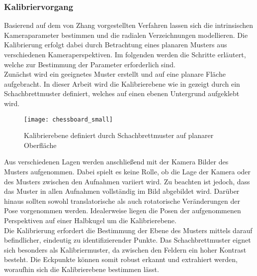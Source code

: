 \subsubsection{Kalibriervorgang}
Basierend auf dem von Zhang \cite{Zhang2000} vorgestellten Verfahren lassen sich die intrinsischen Kameraparameter bestimmen und die radialen Verzeichnungen modellieren. Die Kalibrierung erfolgt dabei durch Betrachtung eines planaren Musters aus verschiedenen Kameraperspektiven. Im folgenden werden die Schritte erläutert, welche zur Bestimmung der Parameter erforderlich sind.\\

Zunächst wird ein geeignetes Muster erstellt und auf eine planare Fläche aufgebracht. In dieser Arbeit wird die Kalibrierebene wie in  gezeigt durch ein Schachbrettmuster definiert, welches auf einen ebenen Untergrund aufgeklebt wird.

\begin{figure}[ht]
	\begin{center}
		\texttt{[image: chessboard\_small]}
		\caption{Kalibrierebene definiert durch Schachbrettmuster auf planarer Oberfläche}
		\label{fig.chesscalib}
	\end{center}
\end{figure}

Aus verschiedenen Lagen werden anschließend mit der Kamera Bilder des Musters aufgenommen. Dabei spielt es keine Rolle, ob die Lage der Kamera oder des Musters zwischen den Aufnahmen variiert wird. Zu beachten ist jedoch, dass das Muster in allen Aufnahmen vollständig im Bild abgebildet wird. Darüber hinaus sollten sowohl translatorische als auch rotatorische Veränderungen der Pose vorgenommen werden. Idealerweise liegen die Posen der aufgenommenen Perspektiven auf einer Halbkugel um die Kalibrierebene.\\

Die Kalibrierung erfordert die Bestimmung der Ebene des Musters mittels darauf befindlicher, eindeutig zu identifizierender Punkte. Das Schachbrettmuster eignet sich besonders als Kalibriermuster, da zwischen den Feldern ein hoher Kontrast besteht. Die Eckpunkte können somit robust erkannt und extrahiert werden, woraufhin sich die Kalibrierebene bestimmen lässt.\\

\prever{
}

